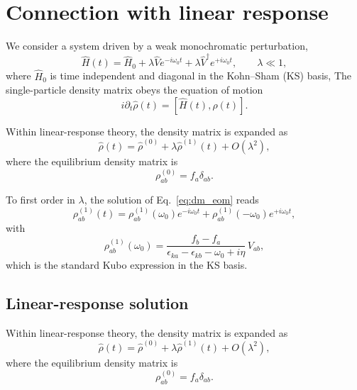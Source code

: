 \documentclass[aps,physrev,preprint,groupedaddress]{revtex4-2}
\renewcommand{\[}{\left[}
\renewcommand{\]}{\right]}
\renewcommand{\(}{\left(}
\renewcommand{\)}{\right)}
\begin{document}
\section{\label{sec:connect} Connection with linear response}
We consider a system driven by a weak monochromatic perturbation,
\begin{equation}
\hat H(t) = \hat H_0
+ \lambda \hat V e^{-i\omega_0 t}
+ \lambda \hat V^\dagger e^{+i\omega_0 t},
\qquad \lambda \ll 1 ,
\end{equation}
where $\hat H_0$ is time independent and diagonal in the Kohn--Sham (KS) basis,
The single-particle density matrix obeys the equation of motion
\begin{equation}
i\partial_t \hat\rho(t) = [\hat H(t),\hat\rho(t)] .
\label{eq:dm_eom}
\end{equation}

Within linear-response theory, the density matrix is expanded as
\begin{equation}
\hat\rho(t) = \hat\rho^{(0)} + \lambda \hat\rho^{(1)}(t) + O(\lambda^2),
\end{equation}
where the equilibrium density matrix is
\begin{equation}
\rho^{(0)}_{ab} = f_a \delta_{ab}.
\end{equation}

To first order in $\lambda$, the solution of Eq.~\eqref{eq:dm_eom} reads
\begin{equation}
\rho^{(1)}_{ab}(t)
=
\rho^{(1)}_{ab}(\omega_0)e^{-i\omega_0 t}
+
\rho^{(1)}_{ab}(-\omega_0)e^{+i\omega_0 t},
\end{equation}
with
\begin{equation}
\rho^{(1)}_{ab}(\omega_0)
=
\frac{f_b - f_a}
{\epsilon_{ka}-\epsilon_{kb}-\omega_0+i\eta}
\,V_{ab},
\label{eq:kubo_dm}
\end{equation}
which is the standard Kubo expression in the KS basis.
\subsection{Linear-response solution}

Within linear-response theory, the density matrix is expanded as
\begin{equation}
\hat\rho(t) = \hat\rho^{(0)} + \lambda \hat\rho^{(1)}(t) + O(\lambda^2),
\end{equation}
where the equilibrium density matrix is
\begin{equation}
\rho^{(0)}_{ab} = f_a \delta_{ab}.
\end{equation}
\end{document}
